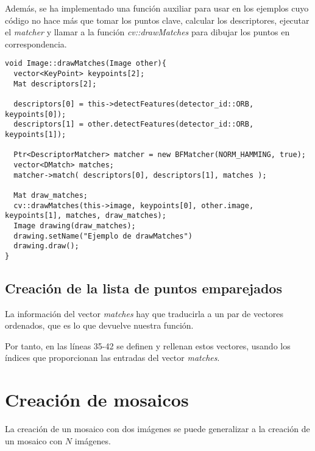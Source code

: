 \documentclass[a4paper, 11pt]{article}
\theoremstyle{definition}
\theoremstyle{theorem}
\begin{document}
  Además, se ha implementado una función auxiliar para usar en los ejemplos cuyo código no hace más que tomar los puntos clave, calcular los descriptores, ejecutar el \emph{matcher} y llamar a la función \emph{cv::drawMatches} para dibujar los puntos en correspondencia.
  \begin{lstlisting}
void Image::drawMatches(Image other){
  vector<KeyPoint> keypoints[2];
  Mat descriptors[2];

  descriptors[0] = this->detectFeatures(detector_id::ORB, keypoints[0]);
  descriptors[1] = other.detectFeatures(detector_id::ORB, keypoints[1]);

  Ptr<DescriptorMatcher> matcher = new BFMatcher(NORM_HAMMING, true);
  vector<DMatch> matches;
  matcher->match( descriptors[0], descriptors[1], matches );

  Mat draw_matches;
  cv::drawMatches(this->image, keypoints[0], other.image, keypoints[1], matches, draw_matches);
  Image drawing(draw_matches);
  drawing.setName("Ejemplo de drawMatches")
  drawing.draw();
}
  \end{lstlisting}

  \subsection{Creación de la lista de puntos emparejados}
  La información del vector \emph{matches} hay que traducirla a un par de vectores ordenados, que es lo que devuelve nuestra función.

  Por tanto, en las líneas 35-42 se definen y rellenan estos vectores, usando los índices que proporcionan las entradas del vector \emph{matches}.

  \section{Creación de mosaicos}
  La creación de un mosaico con dos imágenes se puede generalizar a la creación de un mosaico con $N$ imágenes.
\end{document}
